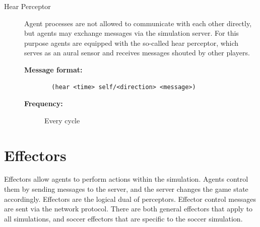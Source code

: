\begin{description}
  \item [Hear Perceptor]
  Agent processes are not allowed to communicate with each other directly, but agents may exchange messages via the simulation server. For this purpose agents are equipped with the so-called hear perceptor, which serves as an aural sensor and receives messages shouted by other players.\cite{SimSpark} 
  \begin{description}
  \item[{\bf Message format:}]
  \begin{verbatim}
  (hear <time> self/<direction> <message>)
  \end{verbatim}
  \item[{\bf Frequency:}]
  Every cycle
  \end{description}

\end{description}
\section{Effectors}
Effectors allow agents to perform actions within the simulation. Agents control them by sending messages to the server, and the server changes the game state accordingly. Effectors are the logical dual of perceptors.
Effector control messages are sent via the network protocol. There are both general effectors that apply to all simulations, and soccer effectors that are specific to the soccer simulation.\cite{SimSpark}\\
